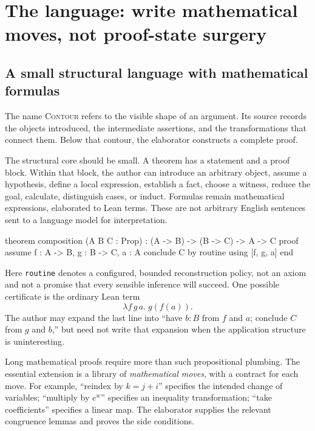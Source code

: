 \documentclass[11pt,a4paper]{article}
\newcommand{\codeid}[1]{\nolinkurl{#1}}
\newcommand{\contour}{\textsc{Contour}}
\begin{document}
\section{The language: write mathematical moves, not proof-state surgery}
\label{sec:language}

\subsection{A small structural language with mathematical formulas}

The name \contour{} refers to the visible shape of an argument. Its source records the objects introduced, the intermediate assertions, and the transformations that connect them. Below that contour, the elaborator constructs a complete proof.

The structural core should be small. A theorem has a statement and a proof block. Within that block, the author can introduce an arbitrary object, assume a hypothesis, define a local expression, establish a fact, choose a witness, reduce the goal, calculate, distinguish cases, or induct. Formulas remain mathematical expressions, elaborated to Lean terms. These are not arbitrary English sentences sent to a language model for interpretation.

\par\noindent\begin{minipage}{\linewidth}
\begin{rawcode}
theorem composition (A B C : Prop) :
    (A -> B) -> (B -> C) -> A -> C
proof
  assume f : A -> B, g : B -> C, a : A
  conclude C by routine using [f, g, a]
end
\end{rawcode}
\end{minipage}\par

Here \codeid{routine} denotes a configured, bounded reconstruction policy, not an axiom and not a promise that every sensible inference will succeed. One possible certificate is the ordinary Lean term
\[
  \lambda f\,g\,a.\;g(f(a)).
\]
The author may expand the last line into ``have $b:B$ from $f$ and $a$; conclude $C$ from $g$ and $b$,'' but need not write that expansion when the application structure is uninteresting.

Long mathematical proofs require more than such propositional plumbing. The essential extension is a library of \emph{mathematical moves}, with a contract for each move. For example, ``reindex by $k=j+i$'' specifies the intended change of variables; ``multiply by $e^w$'' specifies an inequality transformation; ``take coefficients'' specifies a linear map. The elaborator supplies the relevant congruence lemmas and proves the side conditions.
\end{document}
